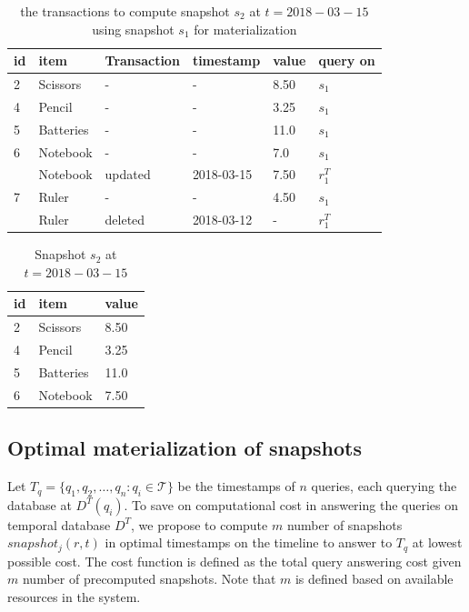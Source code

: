\begin{center}
\begin{table}
	\centering
	\caption{the transactions to compute snapshot $s_2$ at $t = 2018-03-15$ using snapshot $s_1$ for materialization}
	\label{table:transactions_materialized}
	\begin{tabular}{p{1cm}p{2cm}p{2cm}p{3cm}p{2cm}p{2cm}}
		\hline
		id & item & Transaction  &timestamp & value  &query on\\ \hline
		2 & Scissors & - & - & 8.50 & $s_1$ \\ \hline
	  	4 & Pencil & - & - & 3.25 & $s_1$ \\ \hline
  	  	5 & Batteries & - & - & 11.0 & $s_1$ \\ \hline
		6 & Notebook & - & - & 7.0 & $s_1$ \\ 
		  & Notebook & updated & 2018-03-15 & 7.50 & $r_1^T$ \\ \hline
		7 & Ruler & - & - & 4.50 & $s_1$ \\
		  & Ruler & deleted & 2018-03-12 & - & $r_1^T$ \\ \hline
	\end{tabular}
\end{table}
\end{center}

\begin{center}
\begin{table}
	\centering
	\caption{Snapshot $s_2$ at $t = 2018-03-15$}
	\label{table:snapshot_s2}
	\begin{tabular}{p{4cm}p{4cm}p{4cm}}
		\hline
		id & item  & value  \\ \hline
		2 & Scissors & 8.50   \\ 
		4 & Pencil & 3.25   \\ 
		5 & Batteries & 11.0   \\ 
		6 & Notebook & 7.50 \\ \hline
	\end{tabular}
\end{table}
\end{center}

\subsection{Optimal materialization of snapshots}
Let $T_q = \{q_1, q_2, \dots, q_n :q_i \in \mathcal{T}\}$ be the timestamps of $n$ queries, each querying the database at $D^T(q_i)$. To save on computational cost in answering the queries on temporal database $D^T$, we propose to compute $m$ number of snapshots $snapshot_j(r,t)$ in optimal timestamps on the timeline to answer to $T_q$ at lowest possible cost. The cost function is defined as the total query answering cost given $m$ number of precomputed snapshots. Note that $m$ is defined based on available resources in the system.

